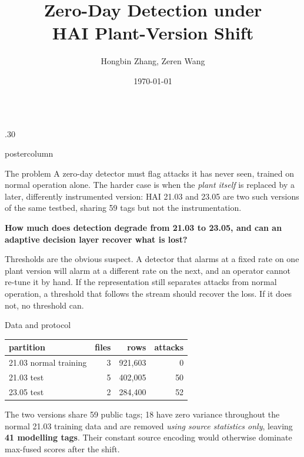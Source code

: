 \documentclass{beamer}
\title{\huge Zero-Day Detection under\\ HAI Plant-Version Shift}
\author{Hongbin Zhang, Zeren Wang}
\institute[Chalmers]{Project Group 88 \,\textbullet\, SSY340 Deep Machine Learning \,\textbullet\, Chalmers University of Technology}
\date{\today}
\newlength{\columnheight}
\begin{document}
\begin{frame}
\begin{columns}

\begin{column}{.30\textwidth}
\begin{beamercolorbox}[center]{postercolumn}
\begin{minipage}{.98\textwidth}
\parbox[t][\columnheight]{\textwidth}{

\begin{myblock}{The problem}
A zero-day detector must flag attacks it has never seen, trained on normal
operation alone. The harder case is when the \emph{plant itself} is replaced by a
later, differently instrumented version: HAI 21.03 and 23.05 are two such versions
of the same testbed, sharing 59 tags but not the instrumentation.

\vspace{0.3cm}
\textbf{How much does detection degrade from 21.03 to 23.05, and can an adaptive
decision layer recover what is lost?}

\vspace{0.3cm}
Thresholds are the obvious suspect. A detector that alarms at a fixed rate on one
plant version will alarm at a different rate on the next, and an operator cannot
re-tune it by hand. If the representation still separates attacks from normal
operation, a threshold that follows the stream should recover the loss. If it does
not, no threshold can.
\end{myblock}\vfill

\begin{myblock}{Data and protocol}
\begin{center}
\small
\begin{tabular}{@{}lrrr@{}}
\toprule
\textbf{partition} & \textbf{files} & \textbf{rows} & \textbf{attacks} \\
\midrule
21.03 normal training & 3 & 921,603 & 0 \\
21.03 test & 5 & 402,005 & 50 \\
23.05 test & 2 & 284,400 & 52 \\
\bottomrule
\end{tabular}
\end{center}

\vspace{0.3cm}
The two versions share 59 public tags; 18 have zero variance throughout the normal
21.03 training data and are removed \emph{using source statistics only}, leaving
\textbf{41 modelling tags}. Their constant source encoding would otherwise dominate
max-fused scores after the shift.
\end{myblock}\vfill

}
\end{minipage}
\end{beamercolorbox}
\end{column}
\end{columns}
\end{frame}
\end{document}

